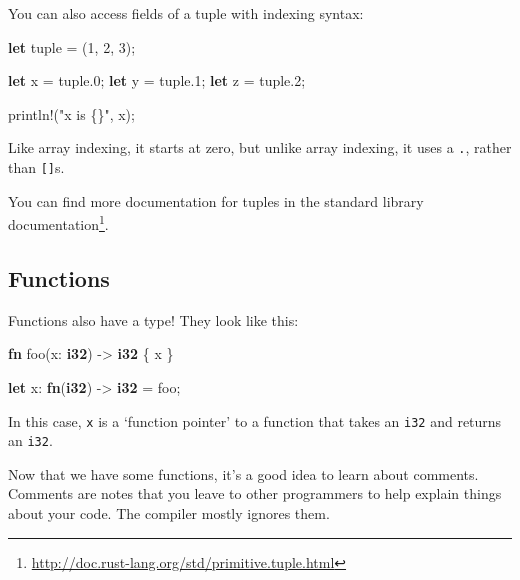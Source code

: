 \documentclass[a4paper,]{book}
\newenvironment{Shaded}{\begin{snugshade}}{\end{snugshade}}
\newcommand{\KeywordTok}[1]{\textcolor[rgb]{0.13,0.29,0.53}{\textbf{{#1}}}}
\newcommand{\DecValTok}[1]{\textcolor[rgb]{0.00,0.00,0.81}{{#1}}}
\newcommand{\StringTok}[1]{\textcolor[rgb]{0.31,0.60,0.02}{{#1}}}
\newcommand{\OtherTok}[1]{\textcolor[rgb]{0.56,0.35,0.01}{{#1}}}
\newcommand{\NormalTok}[1]{{#1}}
\renewcommand{\href}[2]{#2\footnote{\url{#1}}}
\begin{document}
You can also access fields of a tuple with indexing syntax:

\begin{Shaded}
\begin{Highlighting}[]
\KeywordTok{let} \NormalTok{tuple = (}\DecValTok{1}\NormalTok{, }\DecValTok{2}\NormalTok{, }\DecValTok{3}\NormalTok{);}

\KeywordTok{let} \NormalTok{x = tuple.}\DecValTok{0}\NormalTok{;}
\KeywordTok{let} \NormalTok{y = tuple.}\DecValTok{1}\NormalTok{;}
\KeywordTok{let} \NormalTok{z = tuple.}\DecValTok{2}\NormalTok{;}

\OtherTok{println!}\NormalTok{(}\StringTok{"x is \{\}"}\NormalTok{, x);}
\end{Highlighting}
\end{Shaded}

Like array indexing, it starts at zero, but unlike array indexing, it
uses a \texttt{.}, rather than \texttt{{[}{]}}s.

You can find more documentation for tuples
\href{http://doc.rust-lang.org/std/primitive.tuple.html}{in the standard
library documentation}.

\subsection{Functions}\label{functions}

Functions also have a type! They look like this:

\begin{Shaded}
\begin{Highlighting}[]
\KeywordTok{fn} \NormalTok{foo(x: }\KeywordTok{i32}\NormalTok{) -> }\KeywordTok{i32} \NormalTok{\{ x \}}

\KeywordTok{let} \NormalTok{x: }\KeywordTok{fn}\NormalTok{(}\KeywordTok{i32}\NormalTok{) -> }\KeywordTok{i32} \NormalTok{= foo;}
\end{Highlighting}
\end{Shaded}

In this case, \texttt{x} is a `function pointer' to a function that
takes an \texttt{i32} and returns an \texttt{i32}.


Now that we have some functions, it's a good idea to learn about
comments. Comments are notes that you leave to other programmers to help
explain things about your code. The compiler mostly ignores them.
\end{document}
